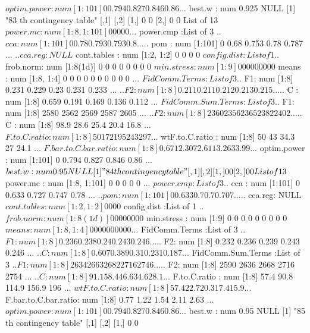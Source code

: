 \documentclass[11pt]{article} %
\begin{document}
\begin{Schunk}
\begin{Soutput}
 $ optim.power         : num [1:101] 0 0.794 0.827 0.846 0.86 ...
 $ best.w              : num 0.925
NULL
[1] "83 th contingency table"
     [,1] [,2]
[1,]    0    0
[2,]    0    0
List of 13
 $ power.mc            : num [1:8, 1:101] 0 0 0 0 0 ...
 $ power.cmp           :List of 3
  ..$ cca    : num [1:101] 0 0.78 0.793 0.793 0.8 ...
  ..$ pom    : num [1:101] 0 0.68 0.753 0.78 0.787 ...
  ..$ cca.reg: NULL
 $ cont.tables         : num [1:2, 1:2] 0 0 0 0
 $ config.dist         :List of 1
  ..$ frob.norm: num [1:8(1d)] 0 0 0 0 0 0 0 0
 $ min.stress          : num [1:9] 0 0 0 0 0 0 0 0 0
 $ means               : num [1:8, 1:4] 0 0 0 0 0 0 0 0 0 0 ...
 $ FidComm.Terms       :List of 3
  ..$ F1: num [1:8] 0.231 0.229 0.23 0.231 0.233 ...
  ..$ F2: num [1:8] 0.211 0.211 0.212 0.213 0.215 ...
  ..$ C : num [1:8] 0.659 0.191 0.169 0.136 0.112 ...
 $ FidComm.Sum.Terms   :List of 3
  ..$ F1: num [1:8] 2580 2562 2569 2587 2605 ...
  ..$ F2: num [1:8] 2360 2356 2365 2382 2402 ...
  ..$ C : num [1:8] 98.9 28.6 25.4 20.4 16.8 ...
 $ F.to.C.ratio        : num [1:8] 50 172 195 243 297 ...
 $ wtF.to.C.ratio      : num [1:8] 50 43 34.3 27 24.1 ...
 $ F.bar.to.C.bar.ratio: num [1:8] 0.671 2.307 2.611 3.263 3.99 ...
 $ optim.power         : num [1:101] 0 0.794 0.827 0.846 0.86 ...
 $ best.w              : num 0.95
NULL
[1] "84 th contingency table"
     [,1] [,2]
[1,]    0    0
[2,]    0    0
List of 13
 $ power.mc            : num [1:8, 1:101] 0 0 0 0 0 ...
 $ power.cmp           :List of 3
  ..$ cca    : num [1:101] 0 0.633 0.727 0.747 0.78 ...
  ..$ pom    : num [1:101] 0 0.633 0.7 0.7 0.707 ...
  ..$ cca.reg: NULL
 $ cont.tables         : num [1:2, 1:2] 0 0 0 0
 $ config.dist         :List of 1
  ..$ frob.norm: num [1:8(1d)] 0 0 0 0 0 0 0 0
 $ min.stress          : num [1:9] 0 0 0 0 0 0 0 0 0
 $ means               : num [1:8, 1:4] 0 0 0 0 0 0 0 0 0 0 ...
 $ FidComm.Terms       :List of 3
  ..$ F1: num [1:8] 0.236 0.238 0.24 0.243 0.246 ...
  ..$ F2: num [1:8] 0.232 0.236 0.239 0.243 0.246 ...
  ..$ C : num [1:8] 0.607 0.389 0.31 0.231 0.187 ...
 $ FidComm.Sum.Terms   :List of 3
  ..$ F1: num [1:8] 2634 2663 2682 2716 2746 ...
  ..$ F2: num [1:8] 2590 2636 2668 2716 2754 ...
  ..$ C : num [1:8] 91.1 58.4 46.6 34.6 28.1 ...
 $ F.to.C.ratio        : num [1:8] 57.4 90.8 114.9 156.9 196 ...
 $ wtF.to.C.ratio      : num [1:8] 57.4 22.7 20.3 17.4 15.9 ...
 $ F.bar.to.C.bar.ratio: num [1:8] 0.77 1.22 1.54 2.11 2.63 ...
 $ optim.power         : num [1:101] 0 0.794 0.827 0.846 0.86 ...
 $ best.w              : num 0.95
NULL
[1] "85 th contingency table"
     [,1] [,2]
[1,]    0    0

\end{Soutput}
\end{Schunk}
\end{document}
